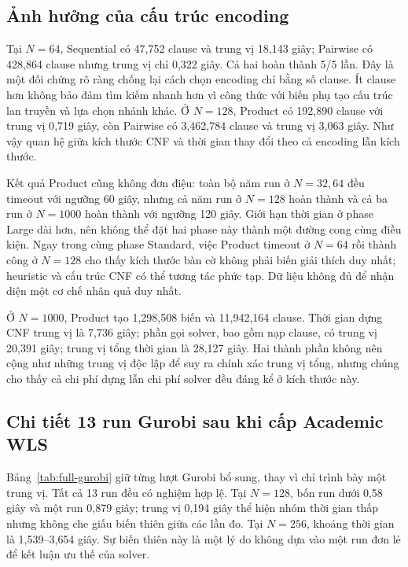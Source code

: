 \subsection{Ảnh hưởng của cấu trúc encoding}

Tại $N=64$, Sequential có 47{,}752 clause và trung vị
18{,}143 giây; Pairwise có 428{,}864 clause nhưng trung vị chỉ
0{,}322 giây. Cả hai hoàn thành 5/5 lần. Đây là một đối chứng rõ
ràng chống lại cách chọn encoding chỉ bằng số clause. Ít clause hơn
không bảo đảm tìm kiếm nhanh hơn vì công thức với biến phụ tạo cấu trúc
lan truyền và lựa chọn nhánh khác. Ở $N=128$, Product có 192{,}890
clause với trung vị 0{,}719 giây, còn Pairwise có 3{,}462{,}784
clause và trung vị 3{,}063 giây. Như vậy quan hệ giữa kích thước CNF
và thời gian thay đổi theo cả encoding lẫn kích thước.

Kết quả Product cũng không đơn điệu: toàn bộ năm run ở $N=32,64$
đều timeout với ngưỡng 60 giây, nhưng cả năm run ở $N=128$ hoàn
thành và cả ba run ở $N=1000$ hoàn thành với ngưỡng 120 giây.
Giới hạn thời gian ở phase Large dài hơn, nên không thể đặt hai
phase này thành một đường cong cùng điều kiện. Ngay trong cùng phase
Standard, việc Product timeout ở $N=64$ rồi thành công ở $N=128$
cho thấy kích thước bàn cờ không phải biến giải thích duy nhất; heuristic
và cấu trúc CNF có thể tương tác phức tạp. Dữ liệu không đủ để nhận diện
một cơ chế nhân quả duy nhất.

Ở $N=1000$, Product tạo 1{,}298{,}508 biến và 11{,}942{,}164
clause. Thời gian dựng CNF trung vị là 7{,}736 giây; phần gọi solver,
bao gồm nạp clause, có trung vị 20{,}391 giây; trung vị tổng thời gian
là 28{,}127 giây. Hai thành phần không nên cộng như những trung vị
độc lập để suy ra chính xác trung vị tổng, nhưng chúng cho thấy cả
chi phí dựng lẫn chi phí solver đều đáng kể ở kích thước này.

\subsection{Chi tiết 13 run Gurobi sau khi cấp Academic WLS}

Bảng~\ref{tab:full-gurobi} giữ từng lượt Gurobi bổ sung, thay vì chỉ
trình bày một trung vị. Tất cả 13 run đều có nghiệm hợp lệ. Tại
$N=128$, bốn run dưới 0{,}58 giây và một run 0{,}879 giây;
trung vị 0{,}194 giây thể hiện nhóm thời gian thấp nhưng không che
giấu biến thiên giữa các lần đo. Tại $N=256$, khoảng thời gian là
1{,}539--3{,}654 giây. Sự biến thiên này là một lý do không dựa
vào một run đơn lẻ để kết luận ưu thế của solver.

